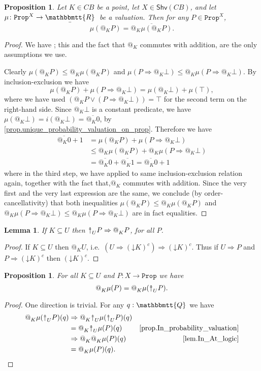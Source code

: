 \documentclass[11pt, oneside, article]{memoir}
\makeatletter
\theoremstyle{plain}
\newtheorem{proposition}[theorem]{Proposition}
\newtheorem{lemma}[theorem]{Lemma}
\theoremstyle{definition}
\theoremstyle{remark}
\renewcommand{\ss}{\subseteq}
\newcommand{\const}[1]{\mathtt{#1}}
\newcommand{\Fun}[1]{\mathsf{#1}}
\newcommand{\ol}[1]{\overline{#1}}
\newcommand{\ubar}[1]{\underaccent{\bar}{#1}}
\newcommand{\internal}[1]{\raisebox{-.03ex}{$\mathbbmtt{#1}$}}
\newcommand{\hs}{\hspace{1.1pt}}
\newcommand{\tQQ}{\internal{Q}\hs}
\newcommand{\tRR}{\internal{R}\hs}
\newcommand{\tLR}{\ubar{\tRR}\hs}
\newcommand{\Shv}{\Fun{Shv}}
\newcommand{\Prop}{\const{Prop}}
\newcommand{\BaseSpace}{B}
\newcommand{\AtSymbol}{{@}}
\newcommand{\InSymbol}{{\upclose}}%
\newcommand{\At}[2][]{\AtSymbol^{#1}_{#2}}
\newcommand{\In}[2][]{\InSymbol^{#1}_{#2}}
\newcommand{\upclose}{{\rotatebox[origin=c]{90}{$\twoheadrightarrow$}}}
\newcommand{\down}{\mathord{\downarrow}}
\newcommand{\imp}{\Rightarrow}
\makeatother
\begin{document}
\begin{proposition}\label{prop.double_at}
Let $K\in C\BaseSpace$ be a point, let $X\in\Shv(C\BaseSpace)$, and let $\mu\colon\Prop^X\to\tLR$ be a valuation. Then for any $P \in \Prop^X$,
\[\mu(\At{K}P)=\ol{\At{K}\mu(\At{K}P)}.\]
\end{proposition}
\begin{proof}
We have ; this and the fact that $\At{K}$ commutes with addition, are the only assumptions we use.

Clearly $\mu(\At{K}P)\leq\At{K}\mu(\At{K}P)$ and $\mu(P\imp\At{K}\bot)\leq\At{K}\mu(P\imp\At{K}\bot)$. By inclusion-exclusion we have
\[\mu(\At{K}P)+\mu(P\imp\At{K}\bot)=\mu(\At{K}\bot)+\mu(\top),\]
where we have used $(\At{K}P\vee(P\imp\At{K}\bot)) = \top$ for the second term on the right-hand side.
Since $\At{K}\bot$ is a constant predicate, we have $\mu(\At{K}\bot)=i(\At{K}\bot)=\ol{\At{K}0}$, by \cref{prop.unique_probability_valuation_on_prop}. Therefore we have 
\begin{align*}
	\ol{\At{K}0}+1
	&=\mu(\At{K}P)+\mu(P\imp\At{K}\bot)\\
	&\leq\At{K}\mu(\At{K}P)+\At{K}\mu(P\imp\At{K}\bot)\\
	&=\ol{\At{K}0}+\ol{\At{K}1}=\ol{\At{K}0}+1
\end{align*}
where in the third step, we have applied to same inclusion-exclusion relation again, together with the fact that,$\At{K}$ commutes with addition. Since the very first and the very last expression are the same, we conclude (by order-cancellativity) that both inequalities  $\mu(\At{K}P) \leq \At{K}\mu(\At{K}P)$ and $\At{K}\mu(P\imp\At{K}\bot) \leq \At{K}\mu(P\imp\At{K}\bot)$ are in fact equalities.
\end{proof}


\begin{lemma}\label{lem.In_At_logic}
If $K\ss U$ then $\In{U}P\imp\At{K}P$, for all $P$.
\end{lemma}
\begin{proof}
If $K\ss U$ then $\At{K}U$, i.e.\ $(U\imp(\down K)^c)\imp(\down K)^c$. Thus if $U\imp P$ and $P\imp(\down K)^c$ then $(\down K)^c$.
\end{proof}

\begin{proposition}
For all $K\subseteq U$ and $P\colon X\to\Prop$ we have
\[\At{K}\mu(P)=\At{K}\mu(\In{U}P).\]
\end{proposition}
\begin{proof}
One direction is trivial. For any $q:\tQQ$ we have
\begin{align*}
	\At{K}\mu(\In{U}P)(q)
	&\imp\At{K}\In{U}\mu(\In{U}P)(q)\\
	&=\At{K}\In{U}\mu(P)(q)&\text{\cref{prop.In_probability_valuation}}\\
	&\imp\At{K}\At{K}\mu(P)(q)&\text{\cref{lem.In_At_logic}}\\	
	&=\At{K}\mu(P)(q).
\end{align*}
\end{proof}
\end{document}
